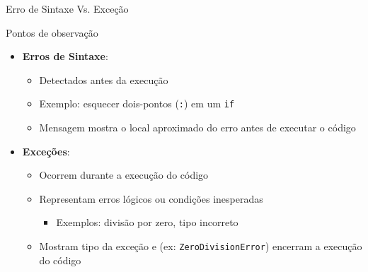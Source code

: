 \begin{frame}{Erro de Sintaxe Vs. Exceção}
    \begin{block}{Pontos de observação}
        \begin{itemize}
            \item \textbf{Erros de Sintaxe}:
                  \begin{itemize}
                      \item Detectados antes da execução
                      \item Exemplo: esquecer dois-pontos (\texttt{:}) em um \texttt{if}
                      \item Mensagem mostra o local aproximado do erro antes de executar o código
                  \end{itemize}

            \item \textbf{Exceções}:
                  \begin{itemize}
                      \item Ocorrem durante a execução do código
                      \item Representam erros lógicos ou condições inesperadas
                            \begin{itemize}
                                \item Exemplos: divisão por zero, tipo incorreto
                            \end{itemize}
                      \item Mostram tipo da exceção e (ex: \texttt{ZeroDivisionError}) encerram a execução do código
                  \end{itemize}
        \end{itemize}
    \end{block}

\end{frame}
